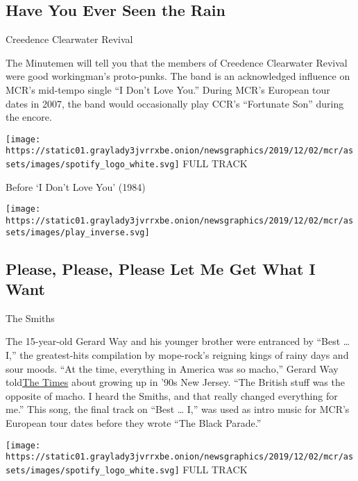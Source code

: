\hypertarget{have-you-ever-seen-the-rain}{%
\subsection{Have You Ever Seen the
Rain}\label{have-you-ever-seen-the-rain}}

Creedence Clearwater Revival

The Minutemen will tell you that the members of Creedence Clearwater
Revival were good workingman's proto-punks. The band is an acknowledged
influence on MCR's mid-tempo single ``I Don't Love You.'' During MCR's
European tour dates in 2007, the band would occasionally play CCR's
``Fortunate Son'' during the encore.

\href{https://open.spotify.com/track/5DnT9a5IM3eMjKgXTWVJvi?si=RFfxd-WzQH2GWA5bAB-LoA}{}

\texttt{[image: https://static01.graylady3jvrrxbe.onion/newsgraphics/2019/12/02/mcr/assets/images/spotify\_logo\_white.svg]}
FULL TRACK

Before `I Don't Love You' (1984)

\texttt{[image: https://static01.graylady3jvrrxbe.onion/newsgraphics/2019/12/02/mcr/assets/images/play\_inverse.svg]}

\hypertarget{please-please-please-let-me-get-what-i-want}{%
\subsection{Please, Please, Please Let Me Get What I
Want}\label{please-please-please-let-me-get-what-i-want}}

The Smiths

The 15-year-old Gerard Way and his younger brother were entranced by
``Best \ldots{} I,'' the greatest-hits compilation by mope-rock's
reigning kings of rainy days and sour moods. ``At the time, everything
in America was so macho,'' Gerard Way
told\href{https://www.nytimes3xbfgragh.onion/2010/12/26/arts/music/26playlist.html}{}\href{https://www.nytimes3xbfgragh.onion/2010/12/26/arts/music/26playlist.html}{The
Times} about growing up in '90s New Jersey. ``The British stuff was the
opposite of macho. I heard the Smiths, and that really changed
everything for me.'' This song, the final track on ``Best \ldots{} I,''
was used as intro music for MCR's European tour dates before they wrote
``The Black Parade.''

\href{https://open.spotify.com/track/6BrMEbPSSj55nQhkgf6DnE?si=3tp9dtOLRpKZmxZWBylG8A}{}

\texttt{[image: https://static01.graylady3jvrrxbe.onion/newsgraphics/2019/12/02/mcr/assets/images/spotify\_logo\_white.svg]}
FULL TRACK

